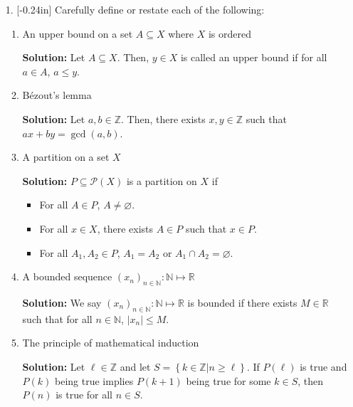 \documentclass[letterpaper,12pt]{article}
\newcommand{\set}[1]{\left\{ #1 \right\}}
\theoremstyle{definition}
\begin{document}
\begin{enumerate}
    \item[1.] \reversemarginpar{}[-0.24in] Carefully define or restate each of the following: \begin{enumerate}
        \item An upper bound on a set $A \subseteq X$ where $X$ is ordered
        \begin{mdframed}
            \textbf{Solution:} Let $A \subseteq X$. Then, $y \in X$ is called an upper bound if for all $a \in A$, $a \leq y$.
        \end{mdframed}
        \vspace{0.5in}
        \item Bézout's lemma
        \begin{mdframed}
            \textbf{Solution:}
            Let $a,b \in \mathbb{Z}$. Then, there exists $x,y \in \mathbb{Z}$ such that $ax + by = \gcd(a,b)$.
        \end{mdframed}
                \vspace{0.5in}
        \item A partition on a set $X$
         \begin{mdframed}
            \textbf{Solution:}
            $P \subseteq \mathcal{P}(X)$ is a partition on $X$ if \begin{itemize}
                \item For all $A \in P$, $A \neq \varnothing$.
                \item For all $x \in X$, there exists $A \in P$ such that $x \in P$.
                \item For all $A_1, A_2 \in P$, $A_1 = A_2$ or $A_1 \cap A_2 = \varnothing$.
            \end{itemize}
            \vspace{0.1in}
        \end{mdframed}
        \item A bounded sequence $(x_n)_{n \in \mathbb{N}} : \mathbb{N} \mapsto \mathbb{R}$
         \begin{mdframed}
            \textbf{Solution:}
            We say $(x_n)_{n \in \mathbb{N}} : \mathbb{N} \mapsto \mathbb{R}$ is bounded if there exists $M \in \mathbb{R}$ such that for all $n \in \mathbb{N}$, $|x_n| \leq M$.
        \end{mdframed}
                \vspace{0.5in}
        \item The principle of mathematical induction
         \begin{mdframed}
            \textbf{Solution:}
             Let $\ell \in \mathbb{Z}$ and let $S = \set{k \in \mathbb{Z} | n \geq \ell}$. If $P(\ell)$ is true and $P(k)$ being true implies $P(k+1)$ being true for some $k \in S$, then $P(n)$ is true for all $n \in S$.
        \end{mdframed}
    \end{enumerate}
\end{enumerate}
\end{document}
